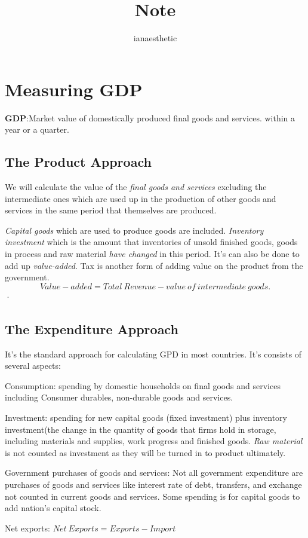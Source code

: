 \documentclass[10pt, a4paper]{article}
\title{Note}
\author{ianaesthetic}
\begin{document}
    \section{Measuring GDP}
        \textbf{GDP}:Market value of domestically produced final goods and services. within a year or a quarter.
        \subsection{The Product Approach}
            We will calculate the value of the \emph{final goods and services} excluding the intermediate ones which are used up in the production of other goods and services in the same period that themselves are produced. 
            
            \emph{Capital goods} which are used to produce goods are included. \emph{Inventory investment} which is the amount that inventories of unsold finished goods, goods in process and raw material \emph{have changed} in this period. It's can also be done to add up \emph{value-added}. Tax is another form of adding value on the product from the government. 
            $$
                Value-added = Total\ Revenue - value\ of\ intermediate\ goods.
            $$·

        \subsection{The Expenditure Approach}
            It's the standard approach for calculating GPD in most countries. It's consists of several aspects: 

                Consumption: spending by domestic households on final goods and services including Consumer durables, non-durable goods and services. 
                
                Investment: spending for new capital goods (fixed investment) plus inventory investment(the change in the quantity of goods that firms hold in storage, including materials and supplies, work progress and finished goods. \emph{Raw material} is not counted as investment as they will be turned in to product ultimately.
                
                Government purchases of goods and services: Not all government expenditure are purchases of goods and services like interest rate of debt, transfers, and exchange not counted in current goods and services. Some spending is for capital goods to add nation's capital stock.

                Net exports: $Net\ Exports = Exports - Import$
\end{document}
